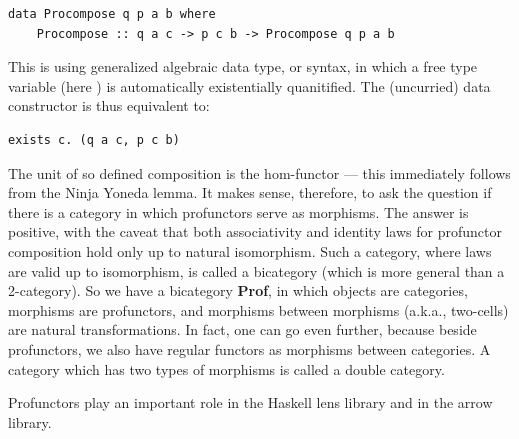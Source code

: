 \begin{Verbatim}[commandchars=\\\{\}]
data Procompose q p a b where
    Procompose :: q a c -> p c b -> Procompose q p a b 
\end{Verbatim}
This is using generalized algebraic data type, or  syntax, in which
a free type variable (here ) is automatically existentially
quanitified. The (uncurried) data constructor  is
thus equivalent to:

\begin{Verbatim}[commandchars=\\\{\}]
exists c. (q a c, p c b)
\end{Verbatim}
The unit of so defined composition is the hom-functor --- this
immediately follows from the Ninja Yoneda lemma. It makes sense,
therefore, to ask the question if there is a category in which
profunctors serve as morphisms. The answer is positive, with the caveat
that both associativity and identity laws for profunctor composition
hold only up to natural isomorphism. Such a category, where laws are
valid up to isomorphism, is called a bicategory (which is more general
than a 2-category). So we have a bicategory \textbf{Prof}, in which
objects are categories, morphisms are profunctors, and morphisms between
morphisms (a.k.a., two-cells) are natural transformations. In fact, one
can go even further, because beside profunctors, we also have regular
functors as morphisms between categories. A category which has two types
of morphisms is called a double category.

Profunctors play an important role in the Haskell lens library and in
the arrow library.